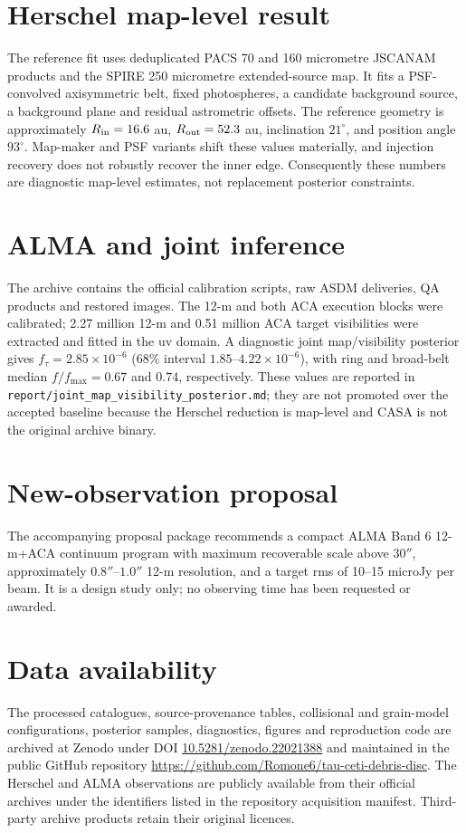 \documentclass[11pt]{article}
\begin{document}
\section{Herschel map-level result}

The reference fit uses deduplicated PACS 70 and 160 micrometre JSCANAM products
and the SPIRE 250 micrometre extended-source map. It fits a PSF-convolved
axisymmetric belt, fixed photospheres, a candidate background source, a
background plane and residual astrometric offsets. The reference geometry is
approximately \(R_{\rm in}=16.6\) au, \(R_{\rm out}=52.3\) au, inclination
\(21^\circ\), and position angle \(93^\circ\). Map-maker and PSF variants shift
these values materially, and injection recovery does not robustly recover the
inner edge. Consequently these numbers are diagnostic map-level estimates,
not replacement posterior constraints.

\section{ALMA and joint inference}

The archive contains the official calibration scripts, raw ASDM deliveries,
QA products and restored images. The 12-m and both ACA execution blocks were
calibrated; 2.27 million 12-m and 0.51 million ACA target visibilities were
extracted and fitted in the uv domain. A diagnostic joint map/visibility
posterior gives \(f_\tau=2.85\times10^{-6}\) (68\% interval
\(1.85\)--\(4.22\times10^{-6}\)), with ring and broad-belt median
\(f/f_{\max}=0.67\) and \(0.74\), respectively. These values are reported in
\texttt{report/joint\_map\_visibility\_posterior.md}; they are not promoted over
the accepted baseline because the Herschel reduction is map-level and CASA is
not the original archive binary.

\section{New-observation proposal}

The accompanying proposal package recommends a compact ALMA Band 6
12-m+ACA continuum program with maximum recoverable scale above \(30''\),
approximately \(0.8''\)--\(1.0''\) 12-m resolution, and a target rms of
10--15 microJy per beam. It is a design study only; no observing time has
been requested or awarded.

\section{Data availability}

The processed catalogues, source-provenance tables, collisional and grain-model
configurations, posterior samples, diagnostics, figures and reproduction code
are archived at Zenodo under DOI
\href{https://doi.org/10.5281/zenodo.22021388}{10.5281/zenodo.22021388} and
maintained in the public GitHub repository
\url{https://github.com/Romone6/tau-ceti-debris-disc}. The Herschel and ALMA
observations are publicly available from their official archives under the
identifiers listed in the repository acquisition manifest. Third-party archive
products retain their original licences.
\end{document}
